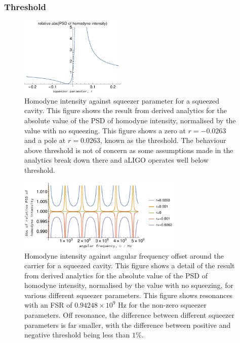 \documentclass[aps,pra,superscriptaddress,reprint,nofootinbib]{revtex4-1}
\begin{document}
\subsubsection{Threshold}

\begin{figure}[ht]
	\begin{center}
	\includegraphics[width=0.45\textwidth]{figures/not_main_PSD_vs_r.pdf}
	\end{center}
	\caption{Homodyne intensity against squeezer parameter for a squeezed cavity. This figure shows the result from derived analytics for the absolute value of the PSD of homodyne intensity, normalised by the value with no squeezing. This figure shows a zero at $r = - 0.0263$ and a pole at $r = 0.0263$, known as the threshold. The behaviour above threshold is not of concern as some assumptions made in the analytics break down there and aLIGO operates well below threshold.}
	\label{fig:not_main_PSD_vs_r}
\end{figure}

\begin{figure}
	\begin{center}
	\includegraphics[width=0.7\textwidth]{figures/not_main_PSD_vs_freq.pdf}
	\end{center}
	\caption{Homodyne intensity against angular frequency offset around the carrier for a squeezed cavity. This figure shows a detail of the result from derived analytics for the absolute value of the PSD of homodyne intensity, normalised by the value with no squeezing, for various different squeezer parameters. This figure shows resonances with an FSR of $0.94248 \times 10^9$ Hz for the non-zero squeezer parameters. Off resonance, the difference between different squeezer parameters is far smaller, with the difference between positive and negative threshold being less than $1\%$.}
	\label{fig:not_main_PSD_vs_freq}
\end{figure}
\end{document}
